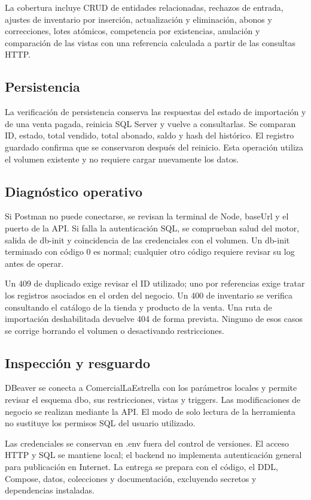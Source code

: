 \documentclass[10pt,letterpaper]{article}
\begin{document}
La cobertura incluye CRUD de entidades relacionadas, rechazos de entrada, ajustes de inventario por inserción, actualización y eliminación, abonos y correcciones, lotes atómicos, competencia por existencias, anulación y comparación de las vistas con una referencia calculada a partir de las consultas HTTP.

\subsection{Persistencia}
La verificación de persistencia conserva las respuestas del estado de importación y de una venta pagada, reinicia SQL Server y vuelve a consultarlas. Se comparan ID, estado, total vendido, total abonado, saldo y hash del histórico. El registro guardado confirma que se conservaron después del reinicio. Esta operación utiliza el volumen existente y no requiere cargar nuevamente los datos.

\subsection{Diagnóstico operativo}
Si Postman no puede conectarse, se revisan la terminal de Node, baseUrl y el puerto de la API. Si falla la autenticación SQL, se comprueban salud del motor, salida de db-init y coincidencia de las credenciales con el volumen. Un db-init terminado con código 0 es normal; cualquier otro código requiere revisar su log antes de operar.

Un 409 de duplicado exige revisar el ID utilizado; uno por referencias exige tratar los registros asociados en el orden del negocio. Un 400 de inventario se verifica consultando el catálogo de la tienda y producto de la venta. Una ruta de importación deshabilitada devuelve 404 de forma prevista. Ninguno de esos casos se corrige borrando el volumen o desactivando restricciones.

\subsection{Inspección y resguardo}
DBeaver se conecta a ComercialLaEstrella con los parámetros locales y permite revisar el esquema dbo, sus restricciones, vistas y triggers. Las modificaciones de negocio se realizan mediante la API. El modo de solo lectura de la herramienta no sustituye los permisos SQL del usuario utilizado.

Las credenciales se conservan en .env fuera del control de versiones. El acceso HTTP y SQL se mantiene local; el backend no implementa autenticación general para publicación en Internet. La entrega se prepara con el código, el DDL, Compose, datos, colecciones y documentación, excluyendo secretos y dependencias instaladas.
\end{document}
